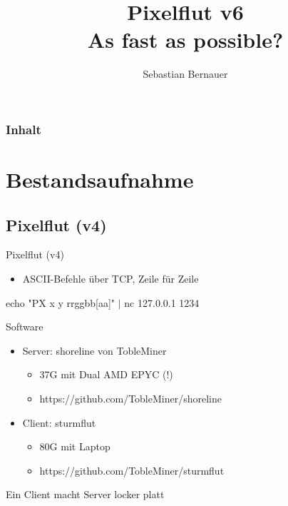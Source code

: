 \documentclass[12pt,donthandout,notes=dontshow,xcolor=table]{beamer}
\author{Sebastian Bernauer}
\title[Pixelflut v6]{Pixelflut v6\\As fast as possible?}
\begin{document}
\begin{frame}
\titlepage
\end{frame}

\begin{frame}%
\frametitle{Inhalt}
\tableofcontents
\end{frame}

\section{Bestandsaufnahme}

\subsection{Pixelflut (v4)}
\begin{frame}{Pixelflut (v4)}
	\begin{itemize}
		\item ASCII-Befehle über TCP, Zeile für Zeile
	\end{itemize}
	\vfill
	\begin{tcolorbox}[title=Verwendung]
	echo "PX x y rrggbb[aa]" $\vert$ nc 127.0.0.1 1234
	\end{tcolorbox}
\end{frame}

\begin{frame}{Software}
	\begin{itemize}
		\item Server: shoreline von TobleMiner
		\begin{itemize}
			\item 37G mit Dual AMD EPYC (!)
			\item https://github.com/TobleMiner/shoreline
		\end{itemize}
		\pause
		\item Client: sturmflut
		\begin{itemize}
			\item 80G mit Laptop
			\item https://github.com/TobleMiner/sturmflut
		\end{itemize}
	\end{itemize}
	\pause
	\begin{tcolorbox}[title=Problem]
	Ein Client macht Server locker platt
	\end{tcolorbox}
\end{frame}
\end{document}
